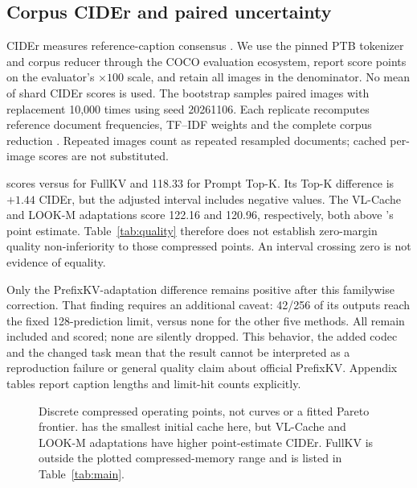 \subsection{Corpus CIDEr and paired uncertainty}
\label{sec:quality}
CIDEr measures reference-caption consensus \citep{vedantam2015cider}.
We use the pinned PTB tokenizer and corpus reducer through the COCO
evaluation ecosystem, report score points on the evaluator's $\times100$
scale, and retain all images in the denominator. No mean of shard CIDEr
scores is used. The bootstrap samples paired images with replacement
10,000 times using seed 20261106. Each replicate recomputes reference
document frequencies, TF--IDF weights and the complete corpus reduction
\citep{efron1979bootstrap}. Repeated images count as repeated resampled
documents; cached per-image scores are not substituted.

\begin{table}[t]
\centering\small

\caption{\Evi{} minus each reference operating point in corpus CIDEr.
Five contrasts form the quality family. Unadjusted paired intervals and
Bonferroni familywise 95\% intervals are both shown. These intervals quantify
paired uncertainty on the inspected cohort; they do not establish dataset
freshness or equal-byte comparisons.}
\label{tab:quality}
\end{table}

\Evi{} scores \EviCider{} versus \FullCider{} for FullKV and 118.33 for
Prompt Top-K. Its Top-K difference is $+1.44$ CIDEr, but the adjusted
interval includes negative values. The VL-Cache and LOOK-M adaptations
score 122.16 and 120.96, respectively, both above \Evi{}'s point estimate.
Table~\ref{tab:quality} therefore does not establish zero-margin quality
non-inferiority to those compressed points. An interval crossing zero is
not evidence of equality.

Only the PrefixKV-adaptation difference remains positive after this
familywise correction. That finding requires an additional caveat:
42/256 of its outputs reach the fixed 128-prediction limit, versus none
for the other five methods. All remain included and scored; none are
silently dropped. This behavior, the added codec and the changed task mean
that the result cannot be interpreted as a reproduction failure or general
quality claim about official PrefixKV. Appendix tables report caption
lengths and limit-hit counts explicitly.

\begin{figure}[t]
\centering
\caption{Discrete compressed operating points, not curves or a fitted Pareto
frontier. \Evi{} has the smallest initial cache here, but VL-Cache and LOOK-M
adaptations have higher point-estimate CIDEr. FullKV is outside the plotted
compressed-memory range and is listed in Table~\ref{tab:main}.}
\label{fig:quality}
\end{figure}

